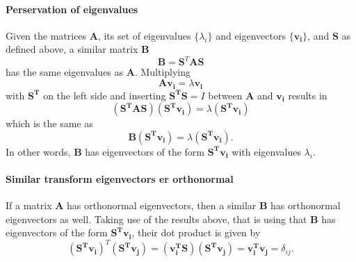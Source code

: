 \documentclass[%
oneside,                 %
final,                   %
10pt]{article}
\begin{document}
\paragraph{Perservation of eigenvalues}	
	Given the matrices $\mathbf{A}$, its set of eigenvalues $\{ \lambda_i \}$ and eigenvectors $\{ \mathbf{v_i} \}$, and $\mathbf{S}$ as defined above, a similar matrix $\mathbf{B}$ 
	\begin{equation}
	\mathbf{B} = \mathbf{S}^T\mathbf{A}\mathbf{S}
	\end{equation}
	has the same eigenvalues as $\mathbf{A}$.
	Multiplying
	\begin{equation}
	\mathbf{Av_i} = \lambda \mathbf{v_i}
	\end{equation}
	with $\mathbf{S^T}$ on the left side and inserting $\mathbf{S^TS}=I$ between $\mathbf{A}$ and $\mathbf{v_i}$ results in
	\begin{equation}
	(\mathbf{S^TAS})(\mathbf{S^Tv_i}) = \lambda (\mathbf{S^Tv_i})
	\end{equation}
	which is the same as
	\begin{equation}
	\mathbf{B} (\mathbf{S^Tv_i}) = \lambda (\mathbf{S^Tv_i}).
	\end{equation}
	In other words, $\mathbf{B}$ has eigenvectors of the form $\mathbf{S^Tv_i}$ with eigenvalues $\lambda_i$.
\paragraph{Similar transform eigenvectors er orthonormal}	
	If a matrix $\mathbf{A}$ has orthonormal eigenvectors, then a similar $\mathbf{B}$ has orthonormal eigenvectors as well.
	Taking use of the results above, that is using that $\mathbf{B}$ has eigenvectors of the form $\mathbf{S^Tv_i}$, 
	their dot product is given by
	\begin{equation}
	(\mathbf{S^Tv_i})^T (\mathbf{S^Tv_j})= (\mathbf{v_i^TS})(\mathbf{S^Tv_j}) = \mathbf{v_i^T}\mathbf{v_j}=\delta_{ij}.
	\end{equation}	
\end{document}
